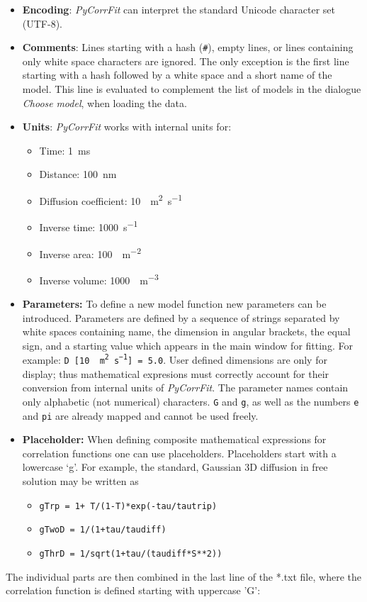 \begin{itemize}
\item \textbf{Encoding}: \textit{PyCorrFit} can interpret the standard Unicode character set (UTF-8).
\item \textbf{Comments}: Lines starting with a hash (\texttt{\#}), empty lines, or lines containing only white space characters are ignored. The only exception is the first line starting with a hash followed by a white space and a short name of the model. This line is evaluated to complement the list of models in the dialogue\textit{ Choose }\textit{model}, when loading the data.
\item \textbf{Units}: \textit{PyCorrFit} works with internal units for:

\begin{itemize}
\item Time: \SI{1}{ms}
\item Distance: \SI{100}{nm}
\item Diffusion coefficient: \SI{10}{\mu m^2s^{-1}} 
\item Inverse time: \SI{1000}{s^{-1}} 
\item Inverse area: \SI{100}{\mu m^{-2}} 
\item Inverse volume: \SI{1000}{\mu m^{-3}} 
\end{itemize}
\item \textbf{Parameters:} To define a new model function new parameters can be introduced. Parameters are defined by a sequence of strings separated by white spaces containing name, the dimension in angular brackets, the equal sign, and a starting value which appears in the main window for fitting. For example: \texttt{D [\SI{10}{\mu m^ 2 s^{-1}}] = 5.0}. User defined dimensions are only for display; thus mathematical expresions must correctly account for their conversion from internal units of \textit{PyCorrFit}. The parameter names contain only alphabetic (not numerical) characters. \texttt{G} and \texttt{g}, as well as the numbers \texttt{e} and \texttt{pi} are already mapped and cannot be used freely.
\item \textbf{Placeholder:} When defining composite mathematical expressions for correlation functions one can use placeholders. Placeholders start with a lowercase ‘g’. For example, the standard, Gaussian 3D diffusion in free solution may be written as

\begin{itemize}
\item \texttt{gTrp = 1+ T/(1-T)*exp(-tau/tautrip)}
\item \texttt{gTwoD = 1/(1+tau/taudiff)}
\item \texttt{gThrD = 1/sqrt(1+tau/(taudiff*S**2))}
\end{itemize}
\end{itemize}
The individual parts are then combined in the last line of the *.txt file, where the correlation function is defined starting with uppercase ’G’:

